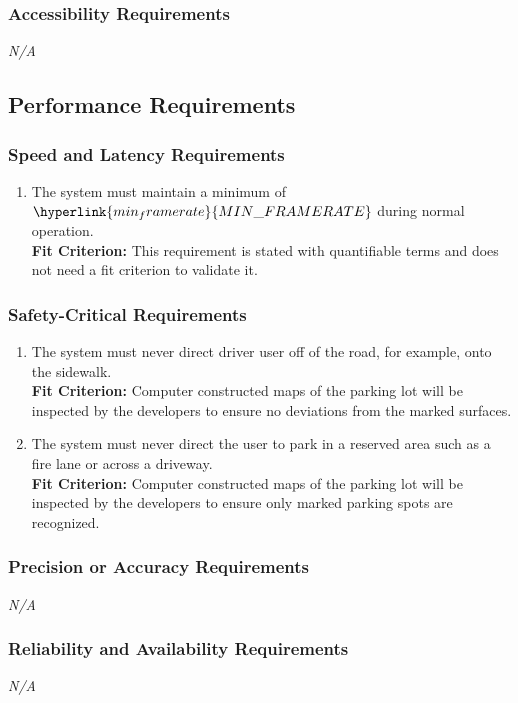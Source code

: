 \documentclass[12pt,letterpaper]{article}
\begin{document}
\subsubsection{Accessibility Requirements}
\noindent \emph{N/A}

\subsection{Performance Requirements}
\subsubsection{Speed and Latency Requirements}
\begin{enumerate}[{PE}1.] 
    \item The system must maintain a minimum of $\hyperlink{min_framerate}{MIN\_FRAMERATE}$ during normal operation.\\
    \textbf{Fit Criterion:} This requirement is stated with quantifiable terms and does not need a fit criterion to validate it. 
\end{enumerate}

\subsubsection{Safety-Critical Requirements}
\begin{enumerate}[resume*] 
    \item The system must never direct driver user off of the road, for example, onto the sidewalk.\\
    \textbf{Fit Criterion:} Computer constructed maps of the parking lot will be inspected by the developers to ensure no deviations from the marked surfaces.
    \item The system must never direct the user to park in a reserved area such as a fire lane or across a driveway.\\
    \textbf{Fit Criterion:} Computer constructed maps of the parking lot will be inspected by the developers to ensure only marked parking spots are recognized.
\end{enumerate}

\subsubsection{Precision or Accuracy Requirements}
\noindent \emph{N/A}

\subsubsection{Reliability and Availability Requirements}
\noindent \emph{N/A}
\end{document}
